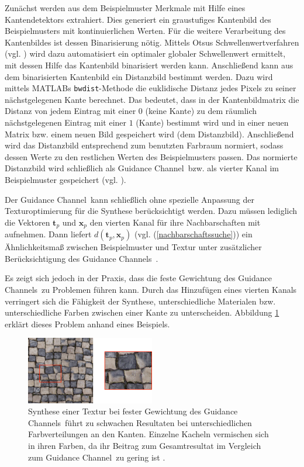 Zunächst werden aus dem Beispielmuster Merkmale mit Hilfe eines Kantendetektors extrahiert.
Dies generiert ein graustufiges Kantenbild des Beispielmusters mit kontinuierlichen Werten.
Für die weitere Verarbeitung des Kantenbildes ist dessen Binarisierung nötig.
Mittels Otsus Schwellenwertverfahren (vgl. \cite{Otsu}) wird dazu automatisiert ein optimaler globaler Schwellenwert ermittelt, mit dessen Hilfe das Kantenbild binarisiert werden kann.
Anschließend kann aus dem binarisierten Kantenbild ein Distanzbild bestimmt werden.
Dazu wird mittels MATLABs \texttt{bwdist}-Methode die euklidische Distanz jedes Pixels zu seiner nächstgelegenen Kante berechnet.
Das bedeutet, dass in der Kantenbildmatrix die Distanz von jedem Eintrag mit einer $0$ (keine Kante) zu dem räumlich nächstgelegenen Eintrag mit einer $1$ (Kante) bestimmt wird und in einer neuen Matrix bzw. einem neuen Bild gespeichert wird (dem Distanzbild).
Anschließend wird das Distanzbild entsprechend zum benutzten Farbraum normiert, sodass dessen Werte zu den restlichen Werten des Beispielmusters passen.
Das normierte Distanzbild wird schließlich als \glqq Guidance Channel\grqq \ bzw. als vierter Kanal im Beispielmuster gespeichert (vgl. \cite{SelfTuning}).

Der \glqq Guidance Channel\grqq \ kann schließlich ohne spezielle Anpassung der Texturoptimierung  für die Synthese berücksichtigt werden.
Dazu müssen lediglich die Vektoren $\textbf{t}_p$ und $\textbf{x}_p$ den vierten Kanal für ihre Nachbarschaften mit aufnehmen.
Dann liefert $d(\textbf{t}_p, \textbf{x}_p)$ (vgl. (\ref{nachbarschaftssuche})) ein Ähnlichkeitsmaß zwischen Beispielmuster und Textur unter zusätzlicher Be\-rück\-sich\-ti\-gung des \glqq Guidance Channels\grqq \ \cite{SelfTuning}.

Es zeigt sich jedoch in der Praxis, dass die feste Gewichtung des \glqq Guidance Channels\grqq \ zu Problemen führen kann.
Durch das Hinzufügen eines vierten Kanals verringert sich die Fähigkeit der Synthese, unterschiedliche Materialen bzw. unterschiedliche Farben zwischen einer Kante zu unterscheiden.
Abbildung \ref{Guidance Channel-weight} erklärt dieses Problem anhand eines Beispiels.

\begin{figure}
	\centering
	\includegraphics[width=0.5\textwidth]{images/guidance-channel-weight}
	\caption{
		Synthese einer Textur bei fester Gewichtung des \glqq Guidance Channels\grqq \ führt zu schwachen Resultaten bei unterschiedlichen Farbverteilungen an den Kanten.
		Einzelne Kacheln vermischen sich in ihren Farben, da ihr Beitrag zum Gesamtresultat im Vergleich zum \glqq Guidance Channel\grqq \ zu gering ist \cite{SelfTuning}.
	}
	\label{Guidance Channel-weight}
\end{figure}

